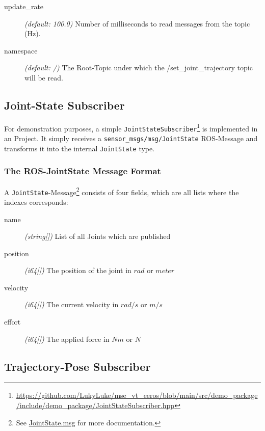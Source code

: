 \begin{description}
    \item[update\_rate] \textit{(default: 100.0)} Number of milliseconds to read messages from the topic (Hz).
    \item[namespace] \textit{(default: /)} The Root-Topic under which the /set\_joint\_trajectory topic will be read.
\end{description}



\subsection[Subscriber]{Joint-State Subscriber} \label{sec:demo-subscriber}

For demonstration purposes, a simple \texttt{JointStateSubscriber}\footnote{\url{https://github.com/LukyLuke/mse_vt_eeros/blob/main/src/demo_package/include/demo_package/JointStateSubscriber.hpp}} is implemented in an  Project.
It simply receives a \texttt{sensor\_msgs/msg/JointState} ROS-Message and transforms it into the internal \texttt{JointState} type.

\subsubsection[JointState-Message]{The ROS-JointState Message Format} \label{sec:deom-subscriber-message}

A \texttt{JointState}-Message\footnote{See \href{https://docs.ros2.org/latest/api/sensor_msgs/msg/JointState.html}{JointState.msg} for more documentation.} consists of four fields, which are all lists where the indexes corresponds:

\begin{description}
    \item[name] \textit{(string[])} List of all Joints which are published
    \item[position] \textit{(i64[])} The position of the joint in $rad$ or $meter$
    \item[velocity] \textit{(i64[])} The current velocity in $rad/s$ or $m/s$
    \item[effort] \textit{(i64[])} The applied force in $Nm$ or $N$
\end{description}


\subsection[Publisher]{Trajectory-Pose Subscriber} \label{sec:demo-publisher}

